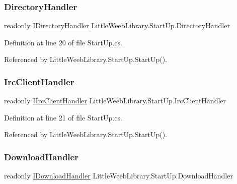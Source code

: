 \subsubsection{\texorpdfstring{Directory\+Handler}{DirectoryHandler}}
{\footnotesize\ttfamily readonly \mbox{\hyperlink{interface_little_weeb_library_1_1_handlers_1_1_i_directory_handler}{I\+Directory\+Handler}} Little\+Weeb\+Library.\+Start\+Up.\+Directory\+Handler\hspace{0.3cm}{\ttfamily [private]}}



Definition at line 20 of file Start\+Up.\+cs.



Referenced by Little\+Weeb\+Library.\+Start\+Up.\+Start\+Up().

\mbox{\label{class_little_weeb_library_1_1_start_up_a2fc62a1c073c34ef1d402bd8f63d2934}} 
\subsubsection{\texorpdfstring{Irc\+Client\+Handler}{IrcClientHandler}}
{\footnotesize\ttfamily readonly \mbox{\hyperlink{interface_little_weeb_library_1_1_handlers_1_1_i_irc_client_handler}{I\+Irc\+Client\+Handler}} Little\+Weeb\+Library.\+Start\+Up.\+Irc\+Client\+Handler\hspace{0.3cm}{\ttfamily [private]}}



Definition at line 21 of file Start\+Up.\+cs.



Referenced by Little\+Weeb\+Library.\+Start\+Up.\+Start\+Up().

\mbox{\label{class_little_weeb_library_1_1_start_up_a03db7121ba274462aa88a7aee4110296}} 
\subsubsection{\texorpdfstring{Download\+Handler}{DownloadHandler}}
{\footnotesize\ttfamily readonly \mbox{\hyperlink{interface_little_weeb_library_1_1_handlers_1_1_i_download_handler}{I\+Download\+Handler}} Little\+Weeb\+Library.\+Start\+Up.\+Download\+Handler\hspace{0.3cm}{\ttfamily [private]}}



